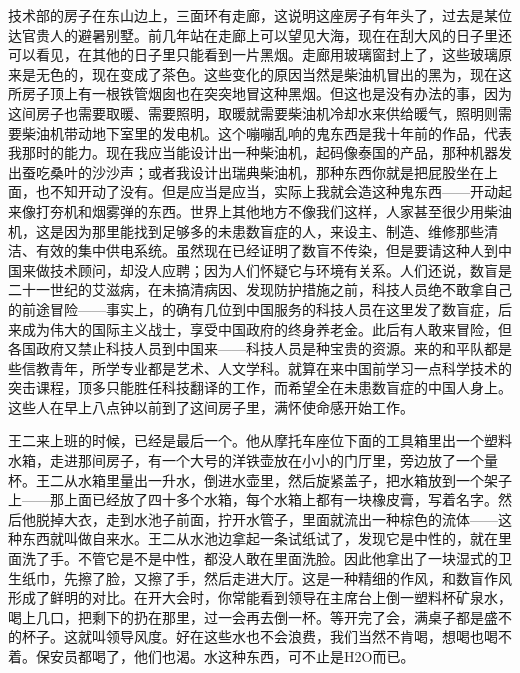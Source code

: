 技术部的房子在东山边上，三面环有走廊，这说明这座房子有年头了，过去是某位达官贵人的避暑别墅。前几年站在走廊上可以望见大海，现在在刮大风的日子里还可以看见，在其他的日子里只能看到一片黑烟。走廊用玻璃窗封上了，这些玻璃原来是无色的，现在变成了茶色。这些变化的原因当然是柴油机冒出的黑为，现在这所房子顶上有一根铁管烟囱也在突突地冒这种黑烟。但这也是没有办法的事，因为这间房子也需要取暖、需要照明，取暖就需要柴油机冷却水来供给暖气，照明则需要柴油机带动地下室里的发电机。这个嘣嘣乱响的鬼东西是我十年前的作品，代表我那时的能力。现在我应当能设计出一种柴油机，起码像泰国的产品，那种机器发出蚕吃桑叶的沙沙声；或者我设计出瑞典柴油机，那种东西你就是把屁股坐在上面，也不知开动了没有。但是应当是应当，实际上我就会造这种鬼东西——开动起来像打夯机和烟雾弹的东西。世界上其他地方不像我们这样，人家甚至很少用柴油机，这是因为那里能找到足够多的未患数盲症的人，来设主、制造、维修那些清洁、有效的集中供电系统。虽然现在已经证明了数盲不传染，但是要请这种人到中国来做技术顾问，却没人应聘；因为人们怀疑它与环境有关系。人们还说，数盲是二十一世纪的艾滋病，在未搞清病因、发现防护措施之前，科技人员绝不敢拿自己的前途冒险——事实上，的确有几位到中国服务的科技人员在这里发了数盲症，后来成为伟大的国际主义战士，享受中国政府的终身养老金。此后有人敢来冒险，但各国政府又禁止科技人员到中国来——科技人员是种宝贵的资源。来的和平队都是些信教青年，所学专业都是艺术、人文学科。就算在来中国前学习一点科学技术的突击课程，顶多只能胜任科技翻译的工作，而希望全在未患数盲症的中国人身上。这些人在早上八点钟以前到了这间房子里，满怀使命感开始工作。 



王二来上班的时候，已经是最后一个。他从摩托车座位下面的工具箱里出一个塑料水箱，走进那间房子，有一个大号的洋铁壶放在小小的门厅里，旁边放了一个量杯。王二从水箱里量出一升水，倒进水壶里，然后旋紧盖子，把水箱放到一个架子上——那上面已经放了四十多个水箱，每个水箱上都有一块橡皮膏，写着名字。然后他脱掉大衣，走到水池子前面，拧开水管子，里面就流出一种棕色的流体——这种东西就叫做自来水。王二从水池边拿起一条试纸试了，发现它是中性的，就在里面洗了手。不管它是不是中性，都没人敢在里面洗脸。因此他拿出了一块湿式的卫生纸巾，先擦了脸，又擦了手，然后走进大厅。这是一种精细的作风，和数盲作风形成了鲜明的对比。在开大会时，你常能看到领导在主席台上倒一塑料杯矿泉水，喝上几口，把剩下的扔在那里，过一会再去倒一杯。等开完了会，满桌子都是盛不的杯子。这就叫领导风度。好在这些水也不会浪费，我们当然不肯喝，想喝也喝不着。保安员都喝了，他们也渴。水这种东西，可不止是H2O而已。 

